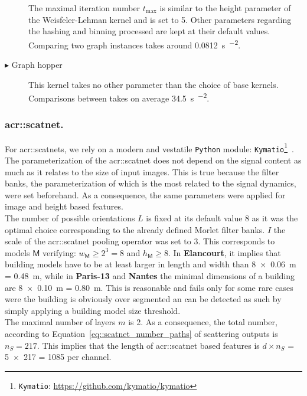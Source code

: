 \begin{description}
                    The maximal iteration number \(t_{\max}\) is similar to the height parameter of the Weisfeler-Lehman kernel and is set to 5.
                    Other parameters regarding the hashing and binning processed are kept at their default values.
                    Comparing two graph instances takes around \SI[scientific-notation = true]{0.0812}{\s\per\building\squared}.
                \item[\(\blacktriangleright\) Graph hopper] This kernel takes no other parameter than the choice of base kernels.
                    Comparisons between takes on average \SI{34.5}{\s\per\building\squared}.
            \end{description}
        
        \subsubsection{\gls*{acr::scatnet}.}
            For \glspl{acr::scatnet}, we rely on a modern and vestatile \verb!Python! module: \verb!Kymatio!\footnote{\verb!Kymatio!: \href{https://github.com/kymatio/kymatio}{https://github.com/kymatio/kymatio}}~\parencite{andreux2018kymatio}.
            The parameterization of the \gls{acr::scatnet} does not depend on the signal content as much as it relates to the size of input images.
            This is true because the filter banks, the parameterization of which is the most related to the signal dynamics, were set beforehand.
            As a consequence, the same parameters were applied for image and height based features.\\
        
            The number of possible orientations \(L\) is fixed at its default value 8 as it was the optimal choice corresponding to the already defined Morlet filter banks.
            \(I\) the scale of the \gls{acr::scatnet} pooling operator was set to 3.
            This corresponds to models \(\mathsf{M}\) verifying: \(w_{\mathsf{M}} \geq 2^3 = 8\) and \(h_{\mathsf{M}} \geq 8\).
            In \textbf{Elancourt}, it implies that building models have to be at least larger in length and width than \SI{8 x 0.06}{\m} = \SI{0.48}{\m}, while in \textbf{Paris-13} and \textbf{Nantes} the minimal dimensions of a building are \SI{8 x 0.10}{\m} = \SI{0.80}{\m}.
            This is reasonable and fails only for some rare cases were the building is obviously over segmented an can be detected as such by simply applying a building model size threshold.\\
            The maximal number of layers \(m\) is 2.
            As a consequence, the total number, according to Equation~\ref{eq::scatnet_number_paths} of scattering outputs is \(n_S = 217\).
            This implies that the length of \gls{acr::scatnet} based features is \(d \times n_S\) = \num{5 x 217} = 1085 per channel.\\
        
